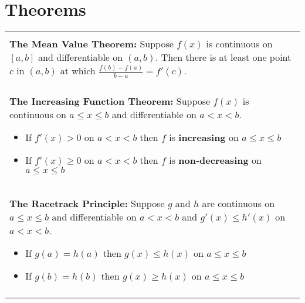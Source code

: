 \documentclass[12pt]{report}
\newenvironment{boxe}
    {\begin{center}
    \begin{tabular}{|p{0.9\textwidth}|}
    \hline\\
    }
    { 
    \\\\\hline
    \end{tabular} 
    \end{center}
    }
\begin{document}
\section*{Theorems}
\begin{boxe}
    \textbf{The Mean Value Theorem:} Suppose $f(x)$ is continuous on $[a,b]$ and differentiable on $(a,b)$. Then there is at least one point $c$ in $(a,b)$ at which $\displaystyle{\frac{f(b)-f(a)}{b-a}=f'(c)}$.\\\\

    \textbf{The Increasing Function Theorem:} Suppose $f(x)$ is continuous on $a\leq x\leq b$ and differentiable on $a< x< b$.
    \begin{itemize}
        \item If $f'(x)> 0$ on $a< x< b$ then $f$ is \textbf{increasing} on $a\leq x\leq b$
        \item If $f'(x)\geq 0$ on $a< x< b$ then $f$ is \textbf{non-decreasing} on $a\leq x\leq b$
    \end{itemize}\\
    
    \textbf{The Racetrack Principle:}
    Suppose $g$ and $h$ are continuous on $a\leq x\leq b$ and differentiable on $a< x< b$ and $g'(x)\leq h'(x)$ on $a< x< b$.
    \begin{itemize}
        \item If $g(a)=h(a)$ then $g(x)\leq h(x)$ on $a\leq x\leq b$
        \item If $g(b)=h(b)$ then $g(x)\geq h(x)$ on $a\leq x\leq b$
    \end{itemize}
\end{boxe}
\end{document}
